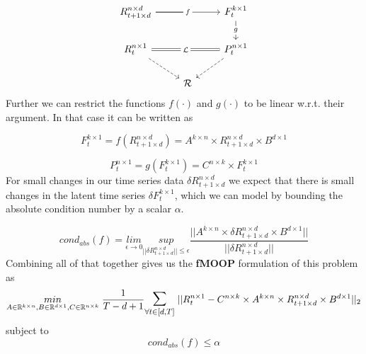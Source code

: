 \begin{equation} \label{pts_diagram}
\begin{tikzcd}
R^{n\times d}_{t+1 \times d} \arrow[rr, "f" description] \arrow[r, no head]& {}& F^{k\times 1}_{t} \arrow[d, "g" description] \\
R^{n\times 1}_t \arrow[rr, "\mathcal{L}" description, Rightarrow, no head] \arrow[rd, dashed] && P^{n \times 1}_{t} \arrow[ld, dashed]\\
& \mathcal{R} &
\end{tikzcd}
\end{equation}\newline 
Further we can restrict the functions $f(\cdot)$ and $g(\cdot)$ to be linear w.r.t. their argument. In that case it can be written as

\begin{equation} \label{f_for_pts}
F^{k\times 1}_t = f(R^{n\times d}_{t+1\times d}) = A^{k\times n}\times R^{n\times d}_{t+1\times d}\times B^{d\times 1}
\end{equation}

\begin{equation} \label{g_for_pts}
P^{n \times 1}_{t} = g(F^{k\times 1}_t) = C^{n \times k} \times F^{k\times 1}_t
\end{equation}
\newline
For small changes in our time series data $\delta R^{n\times d}_{t+1\times d}$ we expect that there is small changes in the latent time series $\delta F^{k\times 1}_t$, which we can model by bounding the absolute condition number by a scalar $\alpha$.

\begin{equation}
    cond_{abs}(f) = \underset{\epsilon \to 0}{lim}\underset{||\delta R^{n\times d}_{t+1\times d}||\le \epsilon}{sup} \frac{||A^{k\times n}\times \delta R^{n\times d}_{t+1\times d}\times B^{d\times 1}||}{||\delta R^{n\times d}_{t+1\times d}||}
\end{equation}\newline
Combining all of that together gives us the \textbf{fMOOP} formulation of this problem as
\begin{equation} \label{pts_loss}
\underset{A\in \mathbb{R}^{k\times n}, B \in \mathbb{R}^{d\times 1}, C \in \mathbb{R}^{n\times k}}{min}\hspace{1mm} \frac{1}{T-d+1} \mathlarger{\mathlarger{\sum}}_{\forall t\in [d,T]} \hspace{1mm} ||R^{n\times 1}_t-C^{n \times k} \times A^{k\times n}\times R^{n\times d}_{t+1\times d}\times B^{d\times 1}||_2
\end{equation}\newline
subject to
\begin{equation} \label{lfm_cond}
cond_{abs}(f) \le \alpha
\end{equation}
\newline


